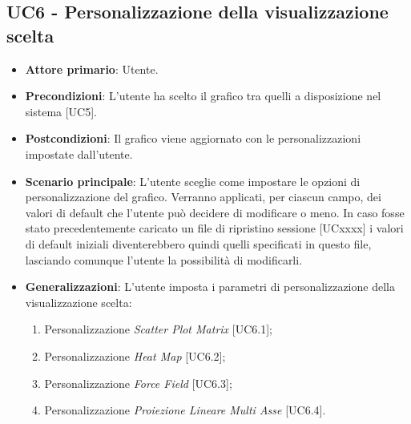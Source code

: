 \subsection{UC6 - Personalizzazione della visualizzazione scelta}
\begin{itemize}
	\item \textbf{Attore primario}: Utente.
	
	\item \textbf{Precondizioni}: L'utente ha scelto il grafico tra quelli a disposizione nel sistema [UC5].
	
	\item \textbf{Postcondizioni}: Il grafico viene aggiornato con le personalizzazioni impostate dall'utente.
	
	\item \textbf{Scenario principale}: L’utente sceglie come impostare le opzioni di personalizzazione del grafico. Verranno applicati, per ciascun campo, dei valori di default che l'utente può decidere di modificare o meno. In caso fosse stato precedentemente caricato un file di ripristino sessione [UCxxxx] i valori di default iniziali diventerebbero quindi quelli specificati in questo file, lasciando comunque l'utente la possibilità di modificarli.
	
	\item \textbf{Generalizzazioni}: L'utente imposta i parametri di personalizzazione della visualizzazione scelta:
	\begin{enumerate}
	\item Personalizzazione \textit{Scatter Plot Matrix} [UC6.1];
	\item Personalizzazione \textit{Heat Map} [UC6.2];
	\item Personalizzazione \textit{Force Field} [UC6.3];
	\item Personalizzazione \textit{Proiezione Lineare Multi Asse} [UC6.4].
	\end{enumerate}
		
\end{itemize}


